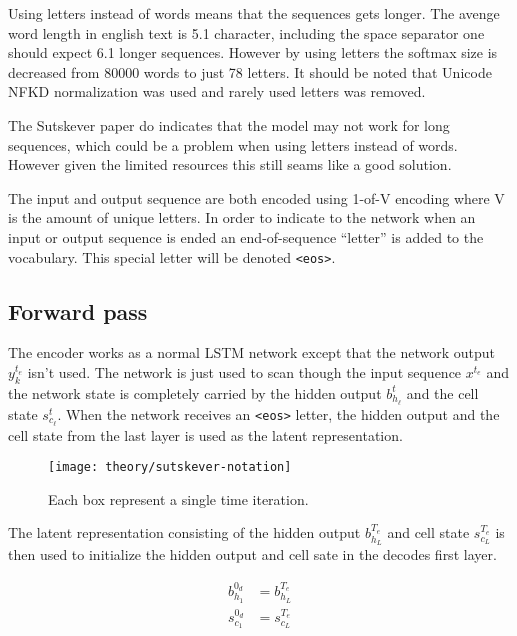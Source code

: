 Using letters instead of words means that the sequences gets longer. The avenge word length in english text is 5.1 character, including the space separator one should expect 6.1 longer sequences. However by using letters the softmax size is decreased from 80000 words to just 78 letters. It should be noted that Unicode NFKD normalization \cite{unicode-normalization} was used and rarely used letters was removed.

The Sutskever paper \cite{sutskever} do indicates that the model may not work for long sequences, which could be a problem when using letters instead of words. However given the limited resources this still seams like a good solution.

The input and output sequence are both encoded using 1-of-V encoding where V is the amount of unique letters. In order to indicate to the network when an input or output sequence is ended an end-of-sequence ``letter'' is added to the vocabulary. This special letter will be denoted \texttt{<eos>}.

\subsection{Forward pass}

The encoder works as a normal LSTM network except that the network output $y_k^{t_e}$ isn't used. The network is just used to scan though the input sequence $x^{t_e}$ and the network state is completely carried by the hidden output $b_{h_\ell}^t$ and the cell state $s_{c_\ell}^t$. When the network receives an \texttt{<eos>} letter, the hidden output and the cell state from the last layer is used as the latent representation.

\begin{figure}[H]
	\centering
	\texttt{[image: theory/sutskever-notation]}
	\caption{Each box represent a single time iteration.}
\end{figure}

The latent representation consisting of the hidden output $b_{h_{L}}^{T_e}$ and cell state $s_{c_{L}}^{T_e}$ is then used to initialize the hidden output and cell sate in the decodes first layer.

\begin{equation}
\begin{aligned}
b_{h_1}^{0_d} &= b_{h_{L}}^{T_e} \\
s_{c_1}^{0_d} &= s_{c_{L}}^{T_e}
\end{aligned}
\end{equation}

